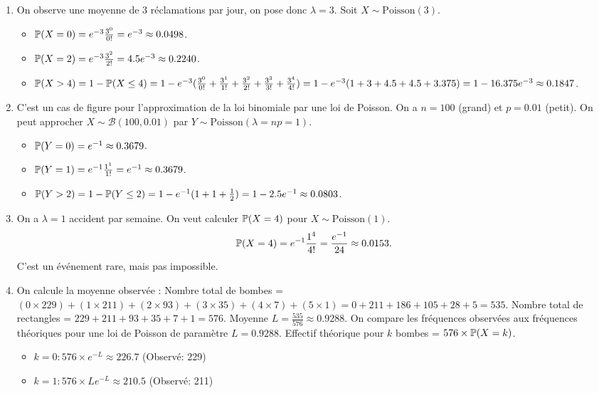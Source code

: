 \documentclass[solutions]{exercices}
\begin{document}
\begin{solution}
\begin{enumerate}
    \item On observe une moyenne de 3 réclamations par jour, on pose donc $\lambda=3$. Soit $X \sim \text{Poisson}(3)$.
    \begin{itemize}
        \item $\P(X=0) = e^{-3} \frac{3^0}{0!} = e^{-3} \approx 0.0498$.
        \item $\P(X=2) = e^{-3} \frac{3^2}{2!} = 4.5 e^{-3} \approx 0.2240$.
        \item $\P(X>4) = 1 - \P(X \le 4) = 1 - e^{-3}(\frac{3^0}{0!} + \frac{3^1}{1!} + \frac{3^2}{2!} + \frac{3^3}{3!} + \frac{3^4}{4!}) = 1 - e^{-3}(1+3+4.5+4.5+3.375) = 1 - 16.375 e^{-3} \approx 0.1847$.
    \end{itemize}
    \item C'est un cas de figure pour l'approximation de la loi binomiale par une loi de Poisson. On a $n=100$ (grand) et $p=0.01$ (petit). On peut approcher $X \sim \mathcal{B}(100, 0.01)$ par $Y \sim \text{Poisson}(\lambda=np=1)$.
    \begin{itemize}
        \item $\P(Y=0) = e^{-1} \approx 0.3679$.
        \item $\P(Y=1) = e^{-1} \frac{1^1}{1!} = e^{-1} \approx 0.3679$.
        \item $\P(Y>2) = 1 - \P(Y \le 2) = 1 - e^{-1}(1+1+\frac{1}{2}) = 1-2.5e^{-1} \approx 0.0803$.
    \end{itemize}
    \item On a $\lambda=1$ accident par semaine. On veut calculer $\P(X=4)$ pour $X \sim \text{Poisson}(1)$.
    \[ \P(X=4) = e^{-1} \frac{1^4}{4!} = \frac{e^{-1}}{24} \approx 0.0153. \]
    C'est un événement rare, mais pas impossible.
    \item On calcule la moyenne observée :
    Nombre total de bombes = $(0 \times 229) + (1 \times 211) + (2 \times 93) + (3 \times 35) + (4 \times 7) + (5 \times 1) = 0 + 211 + 186 + 105 + 28 + 5 = 535$.
    Nombre total de rectangles = $229+211+93+35+7+1 = 576$.
    Moyenne $L = \frac{535}{576} \approx 0.9288$.
    On compare les fréquences observées aux fréquences théoriques pour une loi de Poisson de paramètre $L=0.9288$. Effectif théorique pour $k$ bombes = $576 \times \P(X=k)$.
    \begin{itemize}
        \item $k=0: 576 \times e^{-L} \approx 226.7$ (Observé: 229)
        \item $k=1: 576 \times L e^{-L} \approx 210.5$ (Observé: 211)

\end{itemize}
\end{enumerate}
\end{solution}
\end{document}
